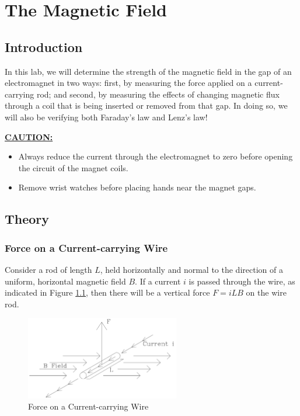 \chapter{The Magnetic Field}

\section{Introduction}

In this lab, we will determine the strength of the magnetic field in the gap of an electromagnet in two ways: first, by measuring the force applied on a current-carrying rod; and second, by measuring the effects of changing magnetic flux through a coil that is being inserted or removed from that gap. In doing so, we will also be verifying both Faraday's law and Lenz's law! \myskip

\underline{\textbf{CAUTION:}}
\begin{itemize}
 \item Always reduce the current through the electromagnet to zero before opening the circuit of the magnet coils.
 \item Remove wrist watches before placing hands near the magnet gaps.
\end{itemize}

\section{Theory}
\subsection{Force on a Current-carrying Wire}
Consider a rod of length $L$, held horizontally and normal to the direction of a uniform, horizontal magnetic field $B$. If a current $i$ is passed through the wire, as indicated in Figure {\ref{fig:force}}, then there will be a vertical force $F=iLB$ on the wire rod.
\begin{figure}[h]
\centering
\includegraphics[width=0.6\textwidth]{./Exp4/pic/image1.png}
\caption{Force on a Current-carrying Wire}
\label{fig:force}
\end{figure}


